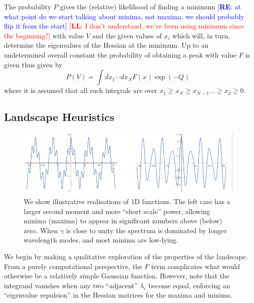 \documentclass[12pt]{article}
\newcommand{\re}[1]{\textcolor{blue}{[{\bf RE}: #1]}}
\newcommand{\lfl}[1]{\textcolor{red}{[{\bf LL}: #1]}}
\begin{document}
The probability $P$ gives the (relative) likelihood of finding a minimum \re{at what point do we start talking about minima, not maxima; we should probably flip it from the start} \lfl{I don't understand, we've been using minimum since the beginning?} with value $V$ and the given values of $x_i$ which will, in turn, determine the eigenvalues of the Hessian at the minimum.  Up to an undetermined overall  constant the probability of obtaining a peak with value $F$ is given thus given by 
%
\begin{equation}
P(V) = \int dx_1 \cdots dx_N F(x) \exp{(-Q)}
\end{equation} 
%
where it is assumed that all such integrals are over $x_1\geq x_N\geq x_{N-1} ... \geq x_2 \geq 0$.


\subsection{Landscape Heuristics}

\begin{figure}
  \centering
  
  \includegraphics[width=\linewidth]{TwoSigmas.png}
  \caption{We show illustrative realisations of 1D functions. The left case has a larger second moment and more “short scale” power, allowing minima (maxima) to appear in significant numbers above (below) zero. When $\gamma$ is close to unity the spectrum is dominated by longer wavelength modes, and most minima are low-lying.}
  \label{examples1}
\end{figure}


We begin by making a qualitative exploration of the properties of the landscape. From a purely computational perspective, the $F$ term complicates what would otherwise be a relatively simple Gaussian function. However, note that the integrand vanishes when any two ``adjacent'' $\lambda_i$ become equal, enforcing an ``eigenvalue repulsion'' in the Hessian matrices for the maxima and minima.   
\end{document}
